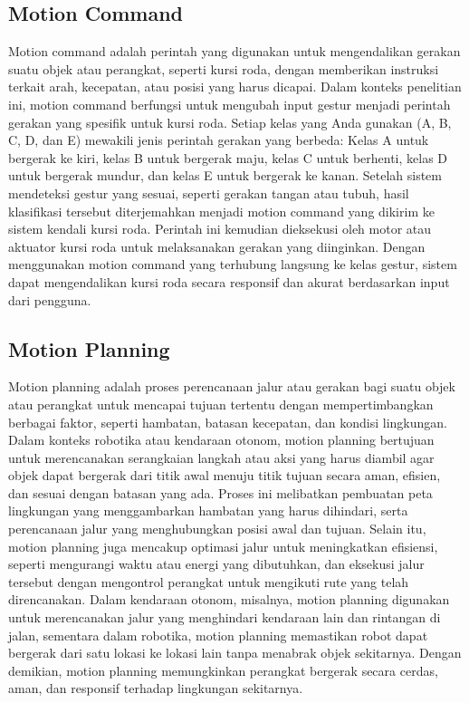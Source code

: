 \subsection{Motion Command}
Motion command adalah perintah yang digunakan untuk mengendalikan gerakan suatu objek atau perangkat, seperti kursi roda, dengan memberikan instruksi terkait arah, kecepatan, atau posisi yang harus dicapai. Dalam konteks penelitian ini, motion command berfungsi untuk mengubah input gestur menjadi perintah gerakan yang spesifik untuk kursi roda. Setiap kelas yang Anda gunakan (A, B, C, D, dan E) mewakili jenis perintah gerakan yang berbeda: Kelas A untuk bergerak ke kiri, kelas B untuk bergerak maju, kelas C untuk berhenti, kelas D untuk bergerak mundur, dan kelas E untuk bergerak ke kanan. Setelah sistem mendeteksi gestur yang sesuai, seperti gerakan tangan atau tubuh, hasil klasifikasi tersebut diterjemahkan menjadi motion command yang dikirim ke sistem kendali kursi roda. Perintah ini kemudian dieksekusi oleh motor atau aktuator kursi roda untuk melaksanakan gerakan yang diinginkan. Dengan menggunakan motion command yang terhubung langsung ke kelas gestur, sistem dapat mengendalikan kursi roda secara responsif dan akurat berdasarkan input dari pengguna.

\subsection{Motion Planning}
Motion planning adalah proses perencanaan jalur atau gerakan bagi suatu objek atau perangkat untuk mencapai tujuan tertentu dengan mempertimbangkan berbagai faktor, seperti hambatan, batasan kecepatan, dan kondisi lingkungan. Dalam konteks robotika atau kendaraan otonom, motion planning bertujuan untuk merencanakan serangkaian langkah atau aksi yang harus diambil agar objek dapat bergerak dari titik awal menuju titik tujuan secara aman, efisien, dan sesuai dengan batasan yang ada. Proses ini melibatkan pembuatan peta lingkungan yang menggambarkan hambatan yang harus dihindari, serta perencanaan jalur yang menghubungkan posisi awal dan tujuan. Selain itu, motion planning juga mencakup optimasi jalur untuk meningkatkan efisiensi, seperti mengurangi waktu atau energi yang dibutuhkan, dan eksekusi jalur tersebut dengan mengontrol perangkat untuk mengikuti rute yang telah direncanakan. Dalam kendaraan otonom, misalnya, motion planning digunakan untuk merencanakan jalur yang menghindari kendaraan lain dan rintangan di jalan, sementara dalam robotika, motion planning memastikan robot dapat bergerak dari satu lokasi ke lokasi lain tanpa menabrak objek sekitarnya. Dengan demikian, motion planning memungkinkan perangkat bergerak secara cerdas, aman, dan responsif terhadap lingkungan sekitarnya.

